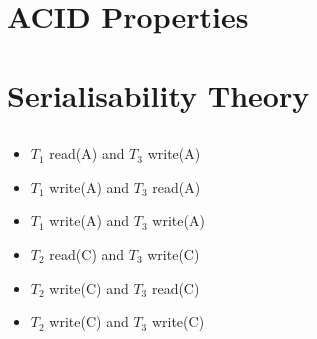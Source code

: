 



\section{ACID Properties}

\section{Serialisability Theory}

\subsection{}	
	
\begin{itemize}
	\item \(T_1\) read(A) and \(T_3\) write(A)
	\item \(T_1\) write(A) and \(T_3\) read(A)
	\item \(T_1\) write(A) and \(T_3\) write(A)
	\item \(T_2\) read(C) and \(T_3\) write(C)
	\item \(T_2\) write(C) and \(T_3\) read(C)
	\item \(T_2\) write(C) and \(T_3\) write(C)
\end{itemize}

\subsection{}



